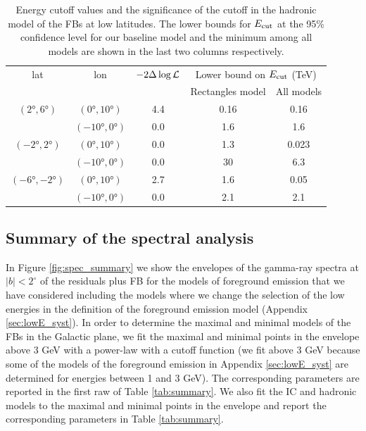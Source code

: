 \begin{table}
  \begin{center}
    \caption{\label{tab:pi0} 
Energy cutoff values and the significance of the cutoff in the hadronic model of the FBs at low latitudes.
The lower bounds for $E_{\text{cut}}$ at the 95\% confidence level for our baseline model and the minimum among all
models are shown in the last two columns respectively. 
}
    \begin{tabular}{|c|c|c|c|c|} %
     	\hline
		 lat & lon  & $-2 \Delta \log {\mathcal{L}}$ & \multicolumn{2}{c|}{Lower bound on $E_{\text{cut}}$ (TeV) } \\
		      &        &                                  &       \multicolumn{1}{c}{Rectangles model} & All models \\ 
		\hline
  		$(\ang{2}, \ang{6})$ & $(\ang{0}, \ang{10})$ & 4.4 & 0.16  & 0.16 \\ 
		& $(\ang{-10}, \ang{0})$ &  0.0 & 1.6 & 1.6 \\ 
 		\hline
  		$(\ang{-2}, \ang{2})$ & $(\ang{0}, \ang{10})$ & 0.0 & 1.3 & 0.023 \\ 
		& $(\ang{-10}, \ang{0})$ & 0.0 & 30 & 6.3 \\ 
 		\hline
  		$(\ang{-6}, \ang{-2})$ & $(\ang{0}, \ang{10})$ & 2.7 & 1.6 & 0.05 \\ 
		& $(\ang{-10}, \ang{0})$ & 0.0 & 2.1 & 2.1 \\ 
 \hline
    \end{tabular}
  \end{center}
\end{table}

\subsection{Summary of the spectral analysis}

In Figure \ref{fig:spec_summary} we show the envelopes of the gamma-ray spectra at $|b| < 2^\circ$ of the residuals plus FB
for the models of foreground emission that we have considered including the models where we change the selection of the low energies 
in the definition of the foreground emission model (Appendix \ref{sec:lowE_syst}).
In order to determine the maximal and minimal models of the FBs in the Galactic plane, 
we fit the maximal and minimal points in the envelope above 3 GeV with a power-law with a cutoff function
(we fit above 3 GeV because some of the models of the foreground emission in Appendix \ref{sec:lowE_syst} are determined 
for energies between 1 and 3 GeV).
The corresponding parameters are reported in the first raw of Table \ref{tab:summary}.
We also fit the IC and hadronic models to the maximal and minimal points in the envelope and report the corresponding parameters
in Table \ref{tab:summary}.


